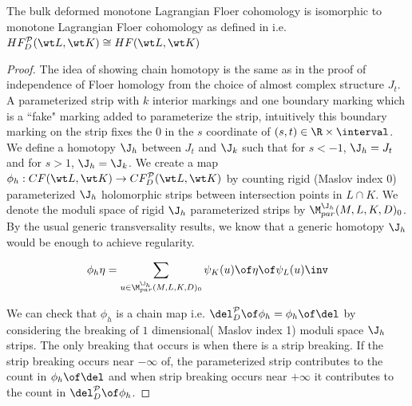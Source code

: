 \begin{lemma}\label{lemm:bulkissame}
 The bulk deformed monotone Lagrangian Floer cohomology is isomorphic to monotone Lagrangian Floer cohomology as defined in \cite{ohMonotone} i.e. $HF^{\mathcal{P}}_D(\wt L , \wt K) \cong HF(\wt L,\wt K)$
\end{lemma}

\begin{proof}
The idea of showing chain homotopy is the same as in the proof of independence of Floer homology from the choice of almost complex structure $J_t$. A parameterized strip with $k$ interior markings and one boundary marking which is a ``fake" marking added to parameterize the strip, intuitively this boundary marking on the strip fixes the $0$ in the $s$ coordinate of $(s,t) \in \R \times \interval$. We define a homotopy $\J_h$ between $J_t$ and $\J_k$ such that for $s<-1$, $\J_h = J_t$ and  for $s>1$, $\J_h = \J_k$. We create a map $\phi_h : CF(\wt L,\wt K) \to CF^{\mathcal{P}}_D(\wt L,\wt K)$  by counting rigid (Maslov index 0) parameterized $\J_h$ holomorphic strips between intersection points in $L \cap K$. We denote the moduli space of  rigid $\J_h$ parameterized strips by $\M_{par}^{\J_h}(M,L,K,D)_{0}$. By the usual generic transversality results, we know that a generic homotopy $\J_h$ would be enough to achieve regularity.  

\begin{equation*}
    \phi_h \eta = \sum_{u\in \M_{par}^{\J_h}(M,L,K,D)_{0}}  \psi_K(u) \of \eta \of \psi_L(u)\inv
\end{equation*}

We can check that $\phi_h$ is a chain map i.e. $\del^{\mathcal{P}}_D \of \phi_h = \phi_h \of \del$ by considering the breaking of $1$ dimensional( Maslov index 1) moduli space $\J_h$ strips. The only breaking that occurs is when there is a strip breaking. If the strip breaking occurs near $-\infty$ of, the parameterized strip  contributes to the count in $\phi_h \of \del$ and when strip breaking occurs near $+\infty$ it contributes to the count in $\del^{\mathcal{P}}_D \of \phi_h$.


\end{proof}
